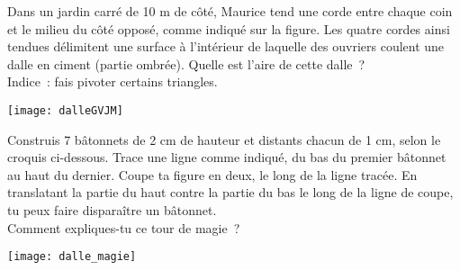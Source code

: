 \begin{enigme}

Dans un jardin carré de 10 m de côté, Maurice tend une corde entre chaque coin et le milieu du côté opposé, comme indiqué sur la figure. Les quatre cordes ainsi tendues délimitent une surface à l’intérieur de laquelle des ouvriers coulent une dalle en ciment (partie ombrée). Quelle est l’aire de cette dalle ? \\[0.5em]
Indice : fais pivoter certains triangles.
\begin{center} \texttt{[image: dalleGVJM]} \end{center}
\end{enigme} 


\begin{enigme}

Construis 7 bâtonnets de 2 cm de hauteur et distants chacun de 1 cm, selon le croquis ci-dessous. Trace une ligne comme indiqué, du bas du premier bâtonnet au haut du dernier. Coupe ta figure en deux, le long de la ligne tracée. En translatant la partie du haut contre la partie du bas le long de la ligne de coupe, tu peux faire disparaître un bâtonnet. \\[0.5em]
Comment expliques-tu ce tour de magie ?
\begin{center} \texttt{[image: dalle\_magie]} \end{center}
\end{enigme} 